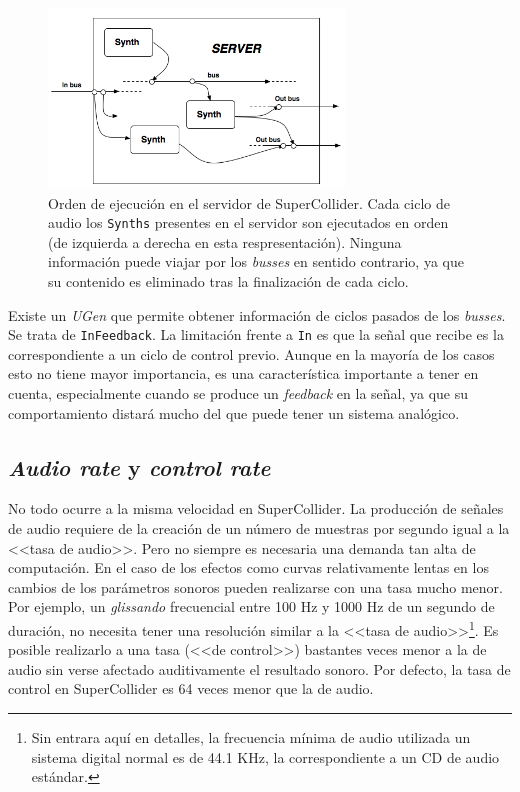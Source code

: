 \begin{figure}
	\centering
	\includegraphics[width=0.7\textwidth]{images/sc_server}
	\caption[Orden de ejecución en el servidor de SuperCollider]{Orden de ejecución en el servidor de SuperCollider. Cada ciclo de audio los \texttt{Synths} presentes en el servidor son ejecutados en orden (de izquierda a derecha en esta respresentación). Ninguna información puede viajar por los \textit{busses} en sentido contrario, ya que su contenido es eliminado tras la finalización de cada ciclo.}
	\label{fig:sc_server}
\end{figure}

Existe un \textit{UGen} que permite obtener información de ciclos pasados de los \textit{busses}. Se trata de \texttt{InFeedback}. La limitación frente a \texttt{In} es que la señal que recibe es la correspondiente a un ciclo de control previo. Aunque en la mayoría de los casos esto no tiene mayor importancia, es una característica importante a tener en cuenta, especialmente cuando se produce un \textit{feedback} en la señal, ya que su comportamiento distará mucho del que puede tener un sistema analógico. 

\subsection{\textit{Audio rate} y \textit{control rate}}
No todo ocurre a la misma velocidad en SuperCollider. La producción de señales de audio requiere de la creación de un número de muestras por segundo igual a la <<tasa de audio>>. Pero no siempre es necesaria una demanda tan alta de computación. En el caso de los efectos como curvas relativamente lentas en los cambios de los parámetros sonoros pueden realizarse con una tasa mucho menor. Por ejemplo, un \textit{glissando} frecuencial entre 100 Hz y 1000 Hz de un segundo de duración, no necesita tener una resolución similar a la <<tasa de audio>>\footnote{Sin entrara aquí en detalles, la frecuencia mínima de audio utilizada un sistema digital normal es de 44.1 KHz, la correspondiente a un CD de audio estándar.}. Es posible realizarlo a una tasa (<<de control>>) bastantes veces menor a la de audio sin verse afectado auditivamente el resultado sonoro. Por defecto, la tasa de control en SuperCollider es 64 veces menor que la de audio.


